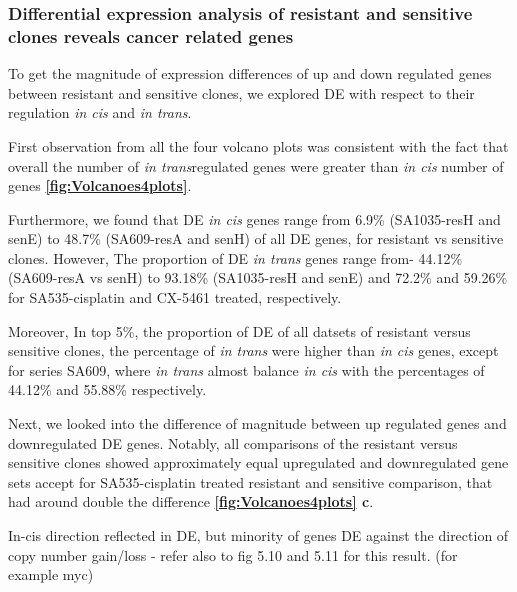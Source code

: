 \subsubsection{Differential expression analysis of resistant and sensitive clones reveals cancer related genes}

To get the magnitude of expression differences of up and down regulated genes between resistant and sensitive clones, we explored \ac{DE} with respect to their regulation \textit{in cis} and \textit{in trans}.

First observation from all the four volcano plots was consistent with the fact that overall the number of \textit{in trans}regulated genes were greater than \textit{in cis} number of genes \textbf{\autoref{fig:Volcanoes4plots}}.


Furthermore, we found that DE \textit{in cis} genes range from 6.9\% (SA1035-resH and senE) to 48.7\% (SA609-resA and senH) of all DE genes, for resistant vs sensitive clones. However, The proportion of DE \textit{in trans} genes range from- 44.12\% (SA609-resA vs senH) to  93.18\% (SA1035-resH and senE) and  72.2\% and  59.26\% for SA535-cisplatin and CX-5461 treated, respectively.

Moreover, In top 5\%, the proportion of \ac{DE} of all datsets of resistant versus sensitive clones, the percentage of \textit{in trans} were higher than \textit{in cis} genes, except for series SA609, where \textit{in trans} almost balance \textit{in cis} with the percentages of 44.12\% and 55.88\% respectively.

Next, we looked into the difference of magnitude between up regulated genes and downregulated \ac{DE} genes. Notably, all comparisons of the resistant versus sensitive clones showed approximately equal upregulated and downregulated gene sets accept for SA535-cisplatin treated resistant and sensitive comparison, that had around double the difference \textbf{\autoref{fig:Volcanoes4plots} c}.

In-cis direction reflected in DE, but minority of genes DE against the direction of copy number gain/loss - refer also to fig 5.10 and 5.11 for this result. (for example myc)




